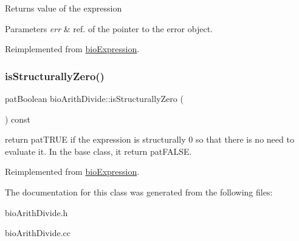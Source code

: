 \begin{DoxyReturn}{Returns}
value of the expression 
\end{DoxyReturn}

\begin{DoxyParams}{Parameters}
{\em err} & ref. of the pointer to the error object. \\
\hline
\end{DoxyParams}


Reimplemented from \hyperlink{classbio_expression_af58662a5d4d456f15bc4f2c9bd4f8a5b}{bio\+Expression}.

\mbox{\label{classbio_arith_divide_a0363fd1159b9167508dcf989844eebb7}} 
\subsubsection{\texorpdfstring{is\+Structurally\+Zero()}{isStructurallyZero()}}
{\footnotesize\ttfamily pat\+Boolean bio\+Arith\+Divide\+::is\+Structurally\+Zero (\begin{DoxyParamCaption}{ }\end{DoxyParamCaption}) const\hspace{0.3cm}{\ttfamily [virtual]}}

return pat\+T\+R\+UE if the expression is structurally 0 so that there is no need to evaluate it. In the base class, it return pat\+F\+A\+L\+SE. 

Reimplemented from \hyperlink{classbio_expression_a264c6d78671610ada8261d698e4c4c42}{bio\+Expression}.



The documentation for this class was generated from the following files\+:\begin{DoxyCompactItemize}
\item 
bio\+Arith\+Divide.\+h\item 
bio\+Arith\+Divide.\+cc\end{DoxyCompactItemize}
